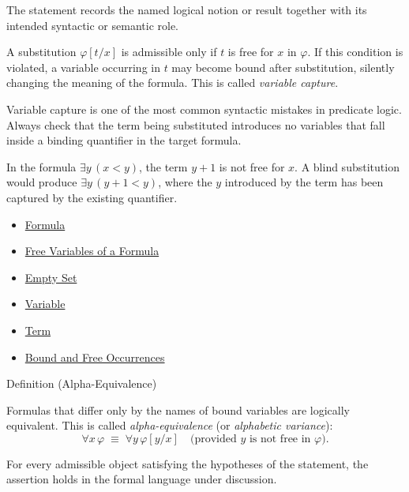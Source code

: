 \begin{remark*}[Interpretation]
The statement records the named logical notion or result together with its
intended syntactic or semantic role.
\end{remark*}

\begin{remark*}[Exposition]
A substitution $\varphi[t/x]$ is admissible only if $t$ is free for $x$ in
$\varphi$. If this condition is violated, a variable occurring in $t$ may
become bound after substitution, silently changing the meaning of the formula.
This is called \emph{variable capture}.
\end{remark*}

\begin{remark*}[Exposition]
Variable capture is one of the most common syntactic mistakes in predicate
logic. Always check that the term being substituted introduces no variables that
fall inside a binding quantifier in the target formula.
\end{remark*}

\begin{remark*}[Examples]
In the formula $\exists y\,(x<y)$, the term $y+1$ is not free for $x$. A blind
substitution would produce $\exists y\,(y+1<y)$, where the $y$ introduced by
the term has been captured by the existing quantifier.
\end{remark*}


\begin{dependencies}
\begin{itemize}
  \item \hyperref[def:formula]{Formula}
  \item \hyperref[def:fv]{Free Variables of a Formula}
  \item \hyperref[def:empty-set]{Empty Set}
  \item \hyperref[def:variable]{Variable}
  \item \hyperref[def:term]{Term}
  \item \hyperref[def:bound-free]{Bound and Free Occurrences}
\end{itemize}
\end{dependencies}

\begin{definitionbox}{Definition (Alpha-Equivalence)}
\begin{definition}\label{def:alpha-equiv}
Formulas that differ only by the names of bound variables are logically
equivalent. This is called \emph{alpha-equivalence} (or \emph{alphabetic
variance}):
\[
\forall x\,\varphi \;\equiv\; \forall y\,\varphi[y/x]
\quad\text{(provided $y$ is not free in $\varphi$).}
\]
\end{definition}
\end{definitionbox}
\begin{remark*}
For every admissible object satisfying the hypotheses of the statement, the
assertion holds in the formal language under discussion.
\end{remark*}

